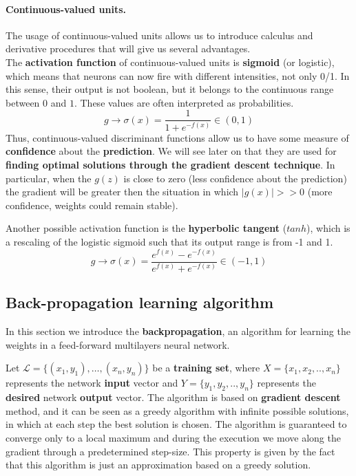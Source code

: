 

\paragraph*{Continuous-valued units.} The usage of continuous-valued units allows us to introduce calculus and derivative procedures that will give us several advantages.\\ 
The \textbf{activation function} of continuous-valued units is \textbf{sigmoid} (or logistic), which means that neurons can now fire with different intensities, not only 0/1. In this sense, their output is not boolean, but it belongs to the continuous range between $0$ and $1$. These values are often interpreted as probabilities.
$$g \rightarrow \sigma(x) = \frac{1}{1+e^{-f(x)}} \in (0,1)$$
Thus, continuous-valued discriminant functions allow us to have some measure of \textbf{confidence} about the \textbf{prediction}. We will see later on that they are used for \textbf{finding optimal solutions through the gradient descent technique}. In particular, when the $g(z)$ is close to zero (less confidence about the prediction) the gradient will be greater then the situation in which $|g(x)| >> 0$ (more confidence, weights could remain stable).

Another possible activation function is the \textbf{hyperbolic tangent} ($tanh$), which is a rescaling of the logistic sigmoid such that its output range is from -1 and 1. 
$$g \rightarrow \sigma(x) = \frac{e^{f(x)} - e^{-f(x)}}{e^{f(x)} + e^ {-f(x)}} \in (-1, 1)$$


\subsection{Back-propagation learning algorithm}
In this section we introduce the \textbf{backpropagation}, an algorithm for learning the weights in a feed-forward multilayers neural network. 

Let $\mathcal{L} = \{(x_1, y_1), \dots, (x_n,y_n) \}$ be a \textbf{training set}, where $X = \{ x_1, x_2, .., x_n \}$ represents the network \textbf{input} vector and $Y = \{ y_1, y_2, .., y_n \}$ represents the \textbf{desired} network \textbf{output} vector. The algorithm is based on \textbf{gradient descent} method, and it can be seen as a greedy algorithm with infinite possible solutions, in which at each step the best solution is chosen. The algorithm is guaranteed to converge only to a local maximum and during the execution we move along the gradient through a predetermined step-size. This property is given by the fact that this algorithm is just an approximation based on a greedy solution.

